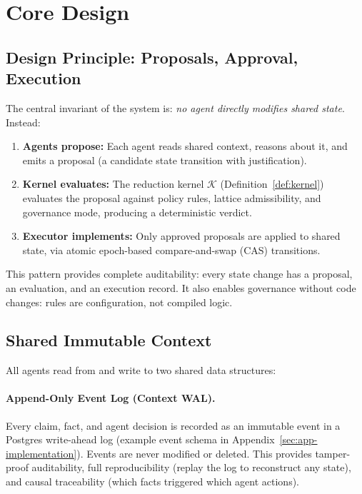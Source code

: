 \documentclass[11pt]{article}
\begin{document}
\section{Core Design}

\subsection{Design Principle: Proposals, Approval, Execution}

The central invariant of the system is: \emph{no agent directly modifies shared state}. Instead:

\begin{enumerate}
  \item \textbf{Agents propose:} Each agent reads shared context, reasons about it, and emits a proposal (a candidate state transition with justification).
  \item \textbf{Kernel evaluates:} The reduction kernel $\mathcal{K}$ (Definition~\ref{def:kernel}) evaluates the proposal against policy rules, lattice admissibility, and governance mode, producing a deterministic verdict.
  \item \textbf{Executor implements:} Only approved proposals are applied to shared state, via atomic epoch-based compare-and-swap (CAS) transitions.
\end{enumerate}

This pattern provides complete auditability: every state change has a proposal, an evaluation, and an execution record. It also enables governance without code changes: rules are configuration, not compiled logic.

\subsection{Shared Immutable Context}
\label{sec:shared-context}

All agents read from and write to two shared data structures:

\paragraph{Append-Only Event Log (Context WAL).}
Every claim, fact, and agent decision is recorded as an immutable event in a Postgres write-ahead log (example event schema in Appendix~\ref{sec:app-implementation}). Events are never modified or deleted. This provides tamper-proof auditability, full reproducibility (replay the log to reconstruct any state), and causal traceability (which facts triggered which agent actions).
\end{document}
